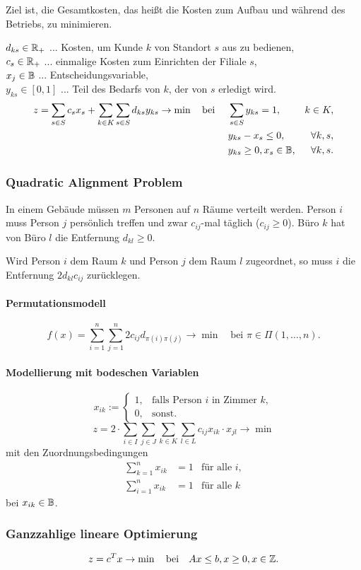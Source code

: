 Ziel ist, die Gesamtkosten, das heißt die Kosten zum Aufbau
und während des Betriebs, zu minimieren.

$d_{ks} \in \mathbb{R}_+$ ... Kosten, um Kunde $k$ von Standort $s$ aus zu bedienen,
\\
$c_s \in \mathbb{R}_+$ ... einmalige Kosten zum Einrichten der Filiale $s$, \\
$x_j \in \mathbb{B}$ ... Entscheidungsvariable, \\
$y_{ks} \in [0,1]$ ... Teil des Bedarfs von $k$, der von $s$ erledigt wird.
\[ \begin{aligned}
    z &= \sum_{s \in S} c_s x_s + \sum_{k \in K} \sum_{s \in S} d_{ks} y_{ks} \to
    \min \quad \text{bei } &
    &\sum_{s \in S} y_{ks} = 1, & k \in K, \\
    & &
    &y_{ks} - x_s \le 0, & \forall k, s, \\
    & &
    &y_{ks} \ge 0, x_s \in \mathbb{B}, & \forall k, s.
  \end{aligned}
\]

\subsubsection{Quadratic Alignment Problem}
In einem Gebäude müssen $m$ Personen auf $n$ Räume verteilt werden. Person $i$
muss Person $j$ persönlich treffen und zwar $c_{ij}$-mal täglich ($c_{ij} \ge
0$). Büro $k$ hat von Büro $l$ die Entfernung $d_{kl} \ge 0$.

Wird Person $i$ dem Raum $k$ und Person $j$ dem Raum $l$ zugeordnet, so muss $i$
die Entfernung $2 d_{kl} c_{ij}$ zurücklegen.

\paragraph{Permutationsmodell}
\[ f(x) = \sum_{i=1}^n \sum_{j=1}^n 2 c_{ij} d_{\pi(i) \pi(j)} \to \min \quad
  \text{bei } \pi \in \Pi(1, \ldots, n). \]

\paragraph{Modellierung mit bodeschen Variablen}
\[ x_{ik} := \begin{cases}
    1, &\text{falls Person $i$ in Zimmer $k$}, \\
    0, &\text{sonst.}
  \end{cases} \]
\[ z = 2 \cdot \sum_{i \in I} \sum_{j \in J} \sum_{k \in K} \sum_{l \in L} c_{ij}
  x_{ik} \cdot x_{jl} \to \min \]
mit den Zuordnungsbedingungen
\[ \begin{aligned}
    \sum_{k = 1}^n x_{ik} &= 1 & \text{für alle } i, \\
    \sum_{i = 1}^n x_{ik} &= 1 & \text{für alle } k
  \end{aligned} \]
bei $x_{ik} \in \mathbb{B}$.

\subsubsection{Ganzzahlige lineare Optimierung}
\[ z = c^T x \to \min \quad \text{bei} \quad Ax \le b, x \ge 0, x \in
  \mathbb{Z}. \]
